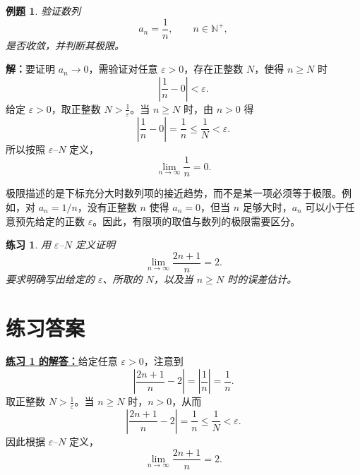 \documentclass[UTF8,fontset=fandol,11pt]{ctexart}
\newtheorem{example}[definition]{例题}
\newtheorem{exercise}[definition]{练习}
\begin{document}
\begin{example}
验证数列
\[
a_n=\frac{1}{n},\qquad n\in\mathbb{N}^{+},
\]
是否收敛，并判断其极限。
\end{example}
\par\noindent\textbf{解：}要证明 $a_n\to0$，需验证对任意 $\varepsilon>0$，存在正整数 $N$，使得 $n\geq N$ 时
\[
\left|\frac{1}{n}-0\right|<\varepsilon.
\]
给定 $\varepsilon>0$，取正整数 $N>\frac{1}{\varepsilon}$。当 $n\geq N$ 时，由 $n>0$ 得
\[
\left|\frac{1}{n}-0\right|=\frac{1}{n}\leq\frac{1}{N}<\varepsilon.
\]
所以按照 $\varepsilon$--$N$ 定义，
\[
\lim_{n\to\infty}\frac{1}{n}=0.
\]\par
极限描述的是下标充分大时数列项的接近趋势，而不是某一项必须等于极限。例如，对 $a_n=1/n$，没有正整数 $n$ 使得 $a_n=0$，但当 $n$ 足够大时，$a_n$ 可以小于任意预先给定的正数 $\varepsilon$。因此，有限项的取值与数列的极限需要区分。\par
\begin{exercise}
\label{mathagent:exercise:41706b9e371cbf8283a4f1192e660b4426644ffb8f650af52f47cef5491b1ca0}
用 $\varepsilon$--$N$ 定义证明
\[
\lim_{n\to\infty}\frac{2n+1}{n}=2.
\]
要求明确写出给定的 $\varepsilon$、所取的 $N$，以及当 $n\geq N$ 时的误差估计。
\end{exercise}
\section*{练习答案}
\par\noindent\textbf{\hyperref[mathagent:exercise:41706b9e371cbf8283a4f1192e660b4426644ffb8f650af52f47cef5491b1ca0]{练习 \ref*{mathagent:exercise:41706b9e371cbf8283a4f1192e660b4426644ffb8f650af52f47cef5491b1ca0} 的解答：}}给定任意 $\varepsilon>0$，注意到
\[
\left|\frac{2n+1}{n}-2\right|=\left|\frac{1}{n}\right|=\frac{1}{n}.
\]
取正整数 $N>\frac{1}{\varepsilon}$。当 $n\geq N$ 时，$n>0$，从而
\[
\left|\frac{2n+1}{n}-2\right|=\frac{1}{n}\leq\frac{1}{N}<\varepsilon.
\]
因此根据 $\varepsilon$--$N$ 定义，
\[
\lim_{n\to\infty}\frac{2n+1}{n}=2.
\]\par
\end{document}
